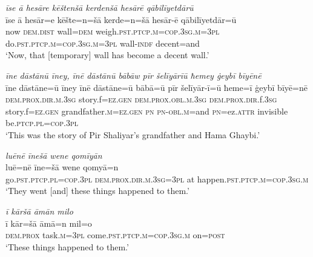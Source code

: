 \ea \label{BP.204}
\textit{īse ā hesāre kēštenšā kerdenšā hesārē qābilīyetdārū} \\ 
\gll īse ā hesār=e kēšte=n=šā kerde=n=šā hesār-ē qābilīyetdār=ū \\ 
 now \textsc{dem.dist} wall\textsc{=dem} weigh\textsc{.pst}\textsc{.ptcp}\textsc{.m}\textsc{=cop}\textsc{.3sg}\textsc{.m}\textsc{=3pl} do\textsc{.pst}\textsc{.ptcp}\textsc{.m}\textsc{=cop}\textsc{.3sg}\textsc{.m}\textsc{=3pl} wall\textsc{-indf} decent=and \\ 
\glt `Now, that [temporary] wall has become a decent wall.'
\z 
 
\ea \label{BP.208}
\textit{īne dāstānū īney, īnē dāstānū bābāw pīr šelīyārīū ħemey ġeybī bīyēnē} \\ 
\gll īne dāstāne=ū īney īnē dāstāne=ū bābā=ū pīr šelīyār-ī=ū ħeme=ī ġeybī bīyē=nē \\ 
 \textsc{dem.prox}\textsc{.dir}\textsc{.m}\textsc{.3sg} story.f\textsc{=ez.gen} \textsc{dem.prox}\textsc{.obl}\textsc{.m}\textsc{.3sg} \textsc{dem.prox}\textsc{.dir}.f\textsc{.3sg} story.f\textsc{=ez.gen} grandfather\textsc{.m}\textsc{=ez.gen} \textsc{pn} \textsc{pn}\textsc{-obl}\textsc{.m}=and \textsc{pn}=ez.\textsc{attr} invisible be\textsc{.ptcp}\textsc{.pl}\textsc{=cop}\textsc{.3pl} \\ 
\glt `This was the story of Pir Shaliyar’s grandfather and Hama Ghaybi.'
\z 
 
\ea \label{BP.209}
\textit{luēnē īnešā wene qomīyān} \\ 
\gll luē=nē īne=šā wene qomyā=n \\ 
 go\textsc{.pst}\textsc{.ptcp}\textsc{.pl}\textsc{=cop}\textsc{.3pl} \textsc{dem.prox}\textsc{.dir}\textsc{.m}\textsc{.3sg}\textsc{=3pl} at happen\textsc{.pst}\textsc{.ptcp}\textsc{.m}\textsc{=cop}\textsc{.3sg}\textsc{.m} \\ 
\glt `They went [and] these things happened to them.'
\z 
 
\ea \label{BP.210}
\textit{ī kāršā āmān milo} \\ 
\gll ī kār=šā āmā=n mil=o \\ 
 \textsc{dem.prox} task\textsc{.m}\textsc{=3pl} come\textsc{.pst}\textsc{.ptcp}\textsc{.m}\textsc{=cop}\textsc{.3sg}\textsc{.m} on\textsc{=\textsc{post}} \\ 
\glt `These things happened to them.'
\z 
 
